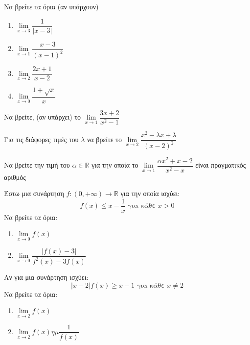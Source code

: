 \documentclass{presentation}
\begin{document}
\begin{askisi}
  Να βρείτε τα όρια (αν υπάρχουν)
  \begin{enumerate}
    \item $\lim\limits_{x \to 3}{ \dfrac{1}{|x-3|} }$ \pause
    \item $\lim\limits_{x \to 1}{ \dfrac{x-3}{(x-1)^2} }$ \pause
    \item $\lim\limits_{x \to 2}{ \dfrac{2x+1}{x-2} }$ \pause
    \item $\lim\limits_{x \to 0}{ \dfrac{1+\sqrt{x}}{x}}$
  \end{enumerate}
\end{askisi}

\begin{askisi}
  Να βρείτε, (αν υπάρχει) το $\lim\limits_{x \to 1}{ \dfrac{3x+2}{x^2-1} }$
\end{askisi}

\begin{askisi}
  Για τις διάφορες τιμές του $λ$ να βρείτε το $\lim\limits_{x \to 2}{ \dfrac{x^2-λx+λ}{(x-2)^2} }$
\end{askisi}

\begin{askisi}
  Να βρείτε την τιμή του $α\in\mathbb{R}$ για την οποία το $\lim\limits_{x \to 1}{\dfrac{αx^2+x-2}{x^2-x}  }$ είναι πραγματικός αριθμός
\end{askisi}

\begin{askisi}
  Έστω μια συνάρτηση $f:(0,+\infty)\to\mathbb{R}$ για την οποία ισχύει:
  $$f(x)\le x-\dfrac{1}{x} \text{ για κάθε } x>0$$
  Να βρείτε τα όρια:
  \begin{enumerate}
    \item $\lim\limits_{x \to 0}{ f(x) }$ \pause
    \item $\lim\limits_{x \to 0}{ \dfrac{|f(x)-3|}{f^2(x)-3f(x)} }$
  \end{enumerate}
\end{askisi}

\begin{askisi}
  Αν για μια συνάρτηση ισχύει:
  $$|x-2|f(x)\ge x-1 \text{ για κάθε } x\ne 2$$
  Να βρείτε τα όρια:
  \begin{enumerate}
    \item $\lim\limits_{x \to 2}{ f(x) }$ \pause
    \item $\lim\limits_{x \to 2}{ f(x)ημ\dfrac{1}{f(x)} }$
  \end{enumerate}
\end{askisi}
\end{document}
